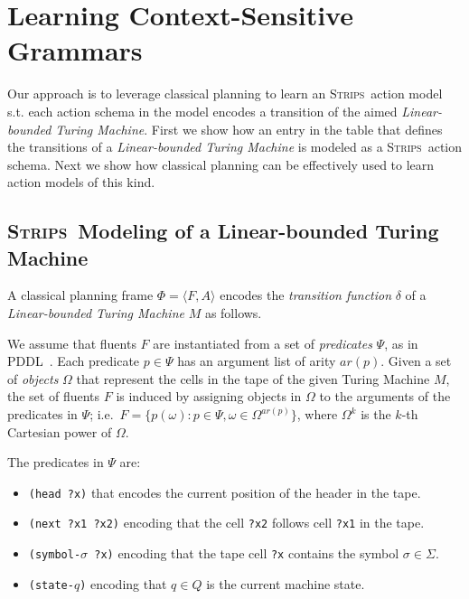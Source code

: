 \documentclass[letterpaper]{article} %
\newcommand{\tup}[1]{{\langle #1 \rangle}}
\newcommand{\strips}{\textsc{Strips}}     %
\begin{document}
\section{Learning Context-Sensitive Grammars}

Our approach is to leverage classical planning to learn an \strips\ action model s.t. each action schema in the model encodes a transition of the aimed {\em Linear-bounded Turing Machine}. First we show how an entry in the table that defines the transitions of a {\em Linear-bounded Turing Machine} is modeled as a \strips\ action schema. Next we show how classical planning can be effectively used to learn action models of this kind.

\subsection{\strips\ Modeling of a Linear-bounded Turing Machine}
A classical planning frame $\Phi=\tup{F,A}$ encodes the {\em transition function} $\delta$ of a {\em Linear-bounded Turing Machine} $M$ as follows.

We assume that fluents $F$ are instantiated from a set of {\em predicates} $\Psi$, as in PDDL~\cite{fox2003pddl2}. Each predicate $p\in\Psi$ has an argument list of arity $ar(p)$. Given a set of {\em objects} $\Omega$ that represent the cells in the tape of the given Turing Machine $M$, the set of fluents $F$ is induced by assigning objects in $\Omega$ to the arguments of the predicates in $\Psi$; i.e.~$F=\{p(\omega):p\in\Psi,\omega\in\Omega^{ar(p)}\}$, where $\Omega^k$ is the $k$-th Cartesian power of $\Omega$.

The predicates in $\Psi$ are:
\begin{itemize}
\item {\tt (head ?x)} that encodes the current position of the header in the tape.
\item {\tt (next ?x1 ?x2)} encoding that the cell {\tt ?x2} follows cell {\tt ?x1} in the tape.
\item {\tt (symbol-$\sigma$ ?x)} encoding that the tape cell {\tt ?x} contains the symbol $\sigma\in\Sigma$.
\item {\tt (state-$q$)} encoding that $q\in Q$ is the current machine state.
\end{itemize}
\end{document}
